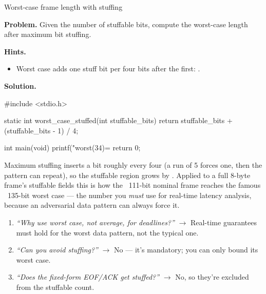\begin{gymproblem}{Worst-case frame length with stuffing}

\textbf{Problem.} Given the number of stuffable bits, compute the worst-case
length after maximum bit stuffing.

\textbf{Hints.}
\begin{itemize}
\item Worst case adds one stuff bit per four bits after the first:
  .
\end{itemize}

\attempt

\textbf{Solution.}
\begin{cgym}
#include <stdio.h>

static int worst_case_stuffed(int stuffable_bits) {
    return stuffable_bits + (stuffable_bits - 1) / 4;
}

int main(void) {
    printf("worst(34)=%
    return 0;
}
\end{cgym}

Maximum stuffing inserts a bit roughly every four (a run of 5 forces one, then
the pattern can repeat), so the stuffable region grows by . Applied
to a full 8-byte frame's stuffable fields this is how the ~111-bit nominal frame
reaches the famous ~135-bit worst case --- the number you \emph{must} use for
real-time latency analysis, because an adversarial data pattern can always force
it.

\followups
\begin{enumerate}
\item \emph{``Why use worst case, not average, for deadlines?''} $\rightarrow$
  Real-time guarantees must hold for the worst data pattern, not the typical
  one.
\item \emph{``Can you avoid stuffing?''} $\rightarrow$ No --- it's mandatory;
  you can only bound its worst case.
\item \emph{``Does the fixed-form EOF/ACK get stuffed?''} $\rightarrow$ No, so
  they're excluded from the stuffable count.
\end{enumerate}
\end{gymproblem}

